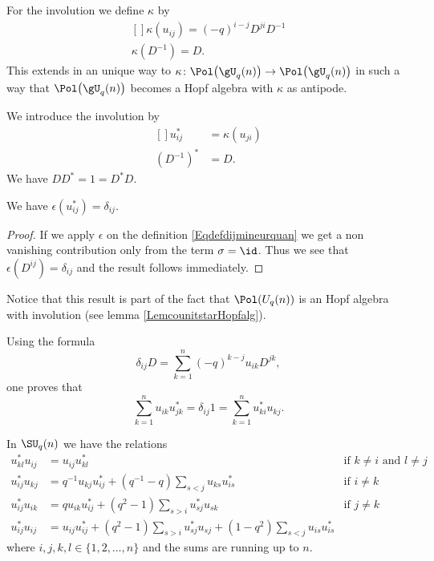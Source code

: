 For the involution we define $\kappa$ by
\begin{equation}        \label{EqDefInvolutionSSUqn}
    \begin{aligned}[]
        \kappa(u_{ij})=(-q)^{i-j}D^{ji}D^{-1}\\
        \kappa(D^{-1})=D.
    \end{aligned}
\end{equation}
This extends in an unique way to $\kappa\colon \Pol\big( \gU_q(n) \big)\to \Pol\big( \gU_q(n) \big)$ in such a way that $\Pol\big( \gU_q(n) \big)$ becomes a Hopf algebra with $\kappa$ as antipode.

We introduce the involution by
\begin{equation}
    \begin{aligned}[]
        u_{ij}^*&=\kappa(u_{ji})\\
        (D^{-1})^*&=D.
    \end{aligned}
\end{equation}
We have $DD^*=1=D^*D$.

\begin{lemma}
    We have \( \epsilon(u_{ij}^*)=\delta_{ij}\).
\end{lemma}

\begin{proof}
    If we apply \( \epsilon\) on the definition \eqref{Eqdefdijmineurquan} we get a non vanishing contribution only from the term \( \sigma=\id\). Thus we see that \( \epsilon(D^{ij})=\delta_{ij}\) and the result follows immediately.
\end{proof}
Notice that this result is part of the fact that \( \Pol(U_q(n))\) is an Hopf algebra with involution (see lemma \ref{LemcounitstarHopfalg}).


Using the formula
\begin{equation}
    \delta_{ij}D=\sum_{k=1}^n(-q)^{k-j}u_{ik}D^{jk},
\end{equation}
one proves that
\begin{equation}        \label{Equustrunsuqn}
    \sum_{k=1}^nu_{ik}u^*_{jk}=\delta_{ij}1=\sum_{k=1}^nu_{ki}^*u_{kj}.
\end{equation}

\begin{lemma}
    In \( \SU_q(n)\) we have the relations\cite{Koelink,Bragiel}
    \begin{subequations}
        \begin{align}
        u^*_{kl}u_{ij}&=u_{ij}u^*_{kl}&\text{if $k\neq i$ and $l\neq j$}\label{eqREflsuusikl}\\
        u_{ij}^*u_{kj}&=q^{-1}u_{kj}u^*_{ij}+(q^{-1}-q)\sum_{s<j}u_{ks}u^*_{is}&\text{if $i\neq k$}     \label{subequkluijeqkneqiuust}\\
        u^*_{ij}u_{ik}&=qu_{ik}u_{ij}^*+(q^2-1)\sum_{s>i}u^*_{sj}u_{sk}&\text{if $j\neq k$}\\
        u^*_{ij}u_{ij}&=u_{ij}u_{ij}^*+(q^2-1)\sum_{s>i}u^*_{sj}u_{sj}+(1-q^2)\sum_{s<j}u_{is}u^*_{is}\label{EqLemsumsumstarpar}
        \end{align}
    \end{subequations}
    where \( i,j,k,l\in\{ 1,2,\ldots,n \}\) and the sums are running up to \( n\).
\end{lemma}

